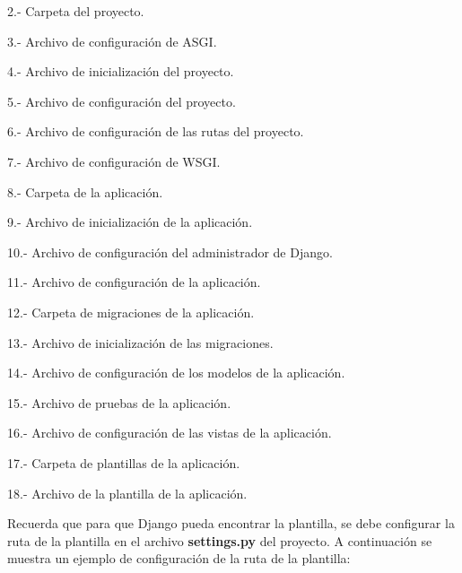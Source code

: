 \documentclass[
  a4paper,
  DIV=11,
  numbers=noendperiod,
  onepage,
  openany]{scrreprt}
\newenvironment{Shaded}{\begin{snugshade}}{\end{snugshade}}
\begin{document}
\begin{tcolorbox}
2.- Carpeta del proyecto.

3.- Archivo de configuración de ASGI.

4.- Archivo de inicialización del proyecto.

5.- Archivo de configuración del proyecto.

6.- Archivo de configuración de las rutas del proyecto.

7.- Archivo de configuración de WSGI.

8.- Carpeta de la aplicación.

9.- Archivo de inicialización de la aplicación.

10.- Archivo de configuración del administrador de Django.

11.- Archivo de configuración de la aplicación.

12.- Carpeta de migraciones de la aplicación.

13.- Archivo de inicialización de las migraciones.

14.- Archivo de configuración de los modelos de la aplicación.

15.- Archivo de pruebas de la aplicación.

16.- Archivo de configuración de las vistas de la aplicación.

17.- Carpeta de plantillas de la aplicación.

18.- Archivo de la plantilla de la aplicación.

Recuerda que para que Django pueda encontrar la plantilla, se debe
configurar la ruta de la plantilla en el archivo \textbf{settings.py}
del proyecto. A continuación se muestra un ejemplo de configuración de
la ruta de la plantilla:

\label{annotated-cell-345}%
\begin{Shaded}
\begin{Highlighting}[]


\end{Highlighting}
\end{Shaded}
\end{tcolorbox}
\end{document}
